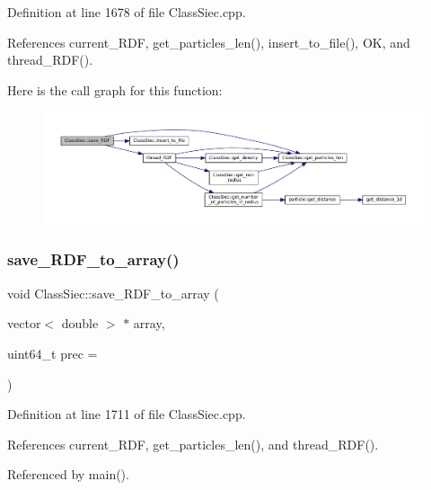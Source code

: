 Definition at line 1678 of file Class\+Siec.\+cpp.



References current\+\_\+\+R\+DF, get\+\_\+particles\+\_\+len(), insert\+\_\+to\+\_\+file(), OK, and thread\+\_\+\+R\+D\+F().

Here is the call graph for this function\+:
\nopagebreak
\begin{figure}[H]
\begin{center}
\leavevmode
\includegraphics[width=350pt]{classClassSiec_a984c7c1d77c9cf78b6254529088028a4_cgraph}
\end{center}
\end{figure}
\mbox{\label{classClassSiec_a9c96b5d39e27f8f2bdda6fd60113ceb6}} 
\subsubsection{\texorpdfstring{save\+\_\+\+R\+D\+F\+\_\+to\+\_\+array()}{save\_RDF\_to\_array()}}
{\footnotesize\ttfamily void Class\+Siec\+::save\+\_\+\+R\+D\+F\+\_\+to\+\_\+array (\begin{DoxyParamCaption}\item[{vector$<$ double $>$ $\ast$}]{array,  }\item[{uint64\+\_\+t}]{prec = {} }\end{DoxyParamCaption})}



Definition at line 1711 of file Class\+Siec.\+cpp.



References current\+\_\+\+R\+DF, get\+\_\+particles\+\_\+len(), and thread\+\_\+\+R\+D\+F().



Referenced by main().

